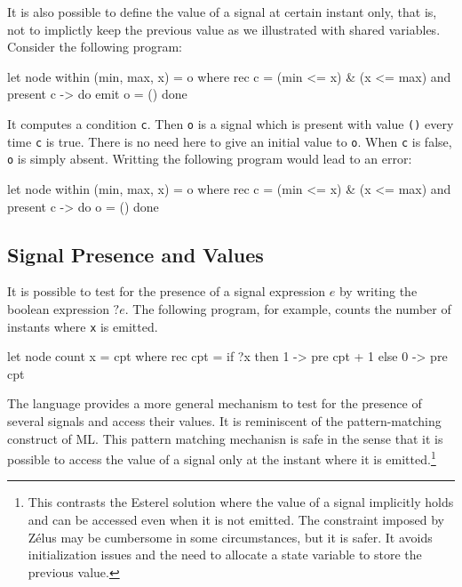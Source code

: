 \documentclass[11pt,titlepage,twoside]{report}
\newcommand{\zelus}{{\sf Z\'elus}}
\newcommand{\esterel}{{\sf Esterel}}
\begin{document}
It is also possible to define the value of a signal at certain instant only,
that is, not to implictly keep the previous value as we illustrated with
shared variables. %
Consider the following program:
\begin{chklisting}[withresult]
let node within (min, max, x) = o where
  rec c = (min <= x) & (x <= max)
  and present c -> do emit o = () done
\end{chklisting}
It computes a condition \verb-c-. Then \verb-o- is a signal
which is present with value \verb-()- every time \verb-c- is
true. There is no need here to give an initial value to \verb-o-. When \verb-c- is
false, \verb-o- is simply absent. Writting the following program would lead to
an error:
\begin{chklisting}
let node within (min, max, x) = o where
  rec c = (min <= x) & (x <= max)
  and present c -> do o = () done
\end{chklisting}

\subsection{Signal Presence and Values\label{signalpresence}} %

It is possible to test for the presence of a signal expression $e$ by
writing the boolean expression $? e$. The following program, for
example, counts the number of instants where \verb-x- is emitted.
\begin{chklisting}[withresult]
let node count x = cpt where
  rec cpt = if ?x then 1 -> pre cpt + 1 else 0 -> pre cpt
\end{chklisting}

The language provides a more general mechanism to test for the
presence of several signals and access their values. It is reminiscent
of the pattern-matching construct of ML.  This pattern matching
mechanisn is safe in the sense that it is possible to access the value
of a signal only at the instant where it is emitted.\footnote{This
  contrasts the \esterel{} solution where the value of a signal
  implicitly holds and can be accessed even when it is not
  emitted. The constraint imposed by \zelus{} may be cumbersome in some circumstances,
  but it is safer. It avoids initialization issues and
  the need to allocate a state variable to store the previous
  value.}
\end{document}

